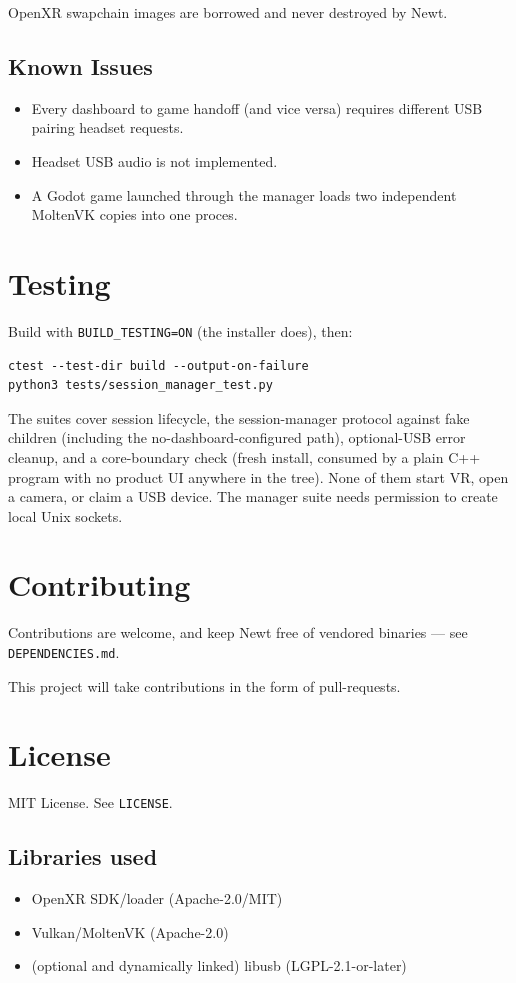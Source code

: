 \documentclass[11pt]{article}
\begin{document}
OpenXR swapchain images are borrowed and never destroyed by Newt.
\subsection{Known Issues}
\label{sec:orgde0f8b8}
\begin{itemize}
\item Every dashboard to  game handoff (and vice versa) requires different USB pairing headset requests.
\item Headset USB audio is not implemented.
\item A Godot game launched through the manager loads two independent MoltenVK copies into one proces.
\end{itemize}
\section{Testing}
\label{sec:org7161a33}
Build with \texttt{BUILD\_TESTING=ON} (the installer does), then:
\begin{verbatim}
ctest --test-dir build --output-on-failure
python3 tests/session_manager_test.py
\end{verbatim}
The suites cover session lifecycle, the session-manager protocol against fake children (including the no-dashboard-configured path), optional-USB error cleanup, and a core-boundary check (fresh install, consumed by a plain C++ program with no product UI anywhere in the tree). None of them start VR, open a camera, or claim a USB device. The manager suite needs permission to create local Unix sockets.
\section{Contributing}
\label{sec:org194cf40}
Contributions are welcome, and keep Newt free of vendored binaries — see \texttt{DEPENDENCIES.md}.

This project will take contributions in the form of pull-requests.
\section{License}
\label{sec:org0c8fbd7}
MIT License. See \texttt{LICENSE}.
\subsection{Libraries used}
\label{sec:org0043671}
\begin{itemize}
\item OpenXR SDK/loader (Apache-2.0/MIT)
\item Vulkan/MoltenVK (Apache-2.0)
\item (optional and dynamically linked) libusb (LGPL-2.1-or-later)
\end{itemize}
\end{document}
